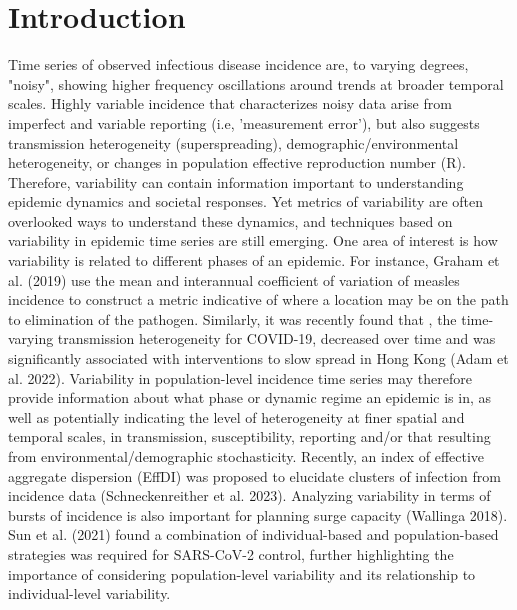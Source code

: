 \documentclass[10pt,letterpaper]{article}
\begin{document}
\section*{Introduction}
Time series of observed infectious disease incidence are, to varying degrees, "noisy", showing higher frequency oscillations around trends at broader temporal scales. Highly variable incidence that characterizes noisy data arise from imperfect and variable reporting (i.e, 'measurement error'), but also suggests transmission heterogeneity (superspreading), demographic/environmental heterogeneity, or changes in population effective reproduction number (R). Therefore, variability can contain information important to understanding epidemic dynamics and societal responses. Yet metrics of variability are often overlooked ways to understand these dynamics, and techniques based on variability in epidemic time series are still emerging. One area of interest is how variability is related to different phases of an epidemic. For instance, Graham et al. (2019) use the mean and interannual coefficient of variation of measles incidence to construct a metric indicative of where a location may be on the path to elimination of the pathogen. Similarly, it was recently found that 
, the time-varying transmission heterogeneity for COVID-19, decreased over time and was significantly associated with interventions to slow spread in Hong Kong (Adam et al. 2022). Variability in population-level incidence time series may therefore provide information about what phase or dynamic regime an epidemic is in, as well as potentially indicating the level of heterogeneity at finer spatial and temporal scales, in transmission, susceptibility, reporting and/or that resulting from environmental/demographic stochasticity. Recently, an index of effective aggregate dispersion (EffDI) was proposed to elucidate clusters of infection from incidence data (Schneckenreither et al. 2023). Analyzing variability in terms of bursts of incidence is also important for planning surge capacity (Wallinga 2018). Sun et al. (2021) found a combination of individual-based and population-based strategies was required for SARS-CoV-2 control, further highlighting the importance of considering population-level variability and its relationship to individual-level variability.
\end{document}
